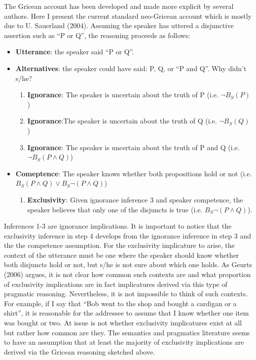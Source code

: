 \documentclass[oneside]{report}
\theoremstyle{definition}
\theoremstyle{definition}
\theoremstyle{definition}
\theoremstyle{remark}
\begin{document}
The Gricean account has been developed and made more explicit by several
authors. Here I present the current standard neo-Gricean account which
is mostly due to U. Sauerland (2004). Assuming the speaker has uttered a
disjunctive assertion such as ``P or Q'', the reasoning proceeds as
follows:
\begin{itemize}
\tightlist
\item
  \textbf{Utterance}: the speaker said ``P or Q''.
\item
  \textbf{Alternatives}: the speaker could have said: P, Q, or ``P and
  Q''. Why didn't s/he?
  \begin{enumerate}
  \def\labelenumi{\arabic{enumi}.}
  \tightlist
  \item
    \textbf{Ignorance}: The speaker is uncertain about the truth of P
    (i.e. \(\lnot B_S (P)\))
  \item
    \textbf{Ignorance}:The speaker is uncertain about the truth of Q
    (i.e. \(\lnot B_S (Q)\))
  \item
    \textbf{Ignorance}: The speaker is uncertain about the truth of P
    and Q (i.e. \(\lnot B_S (P \land Q)\))
  \end{enumerate}
\item
  \textbf{Comeptence}: The speaker knows whether both propositions hold
  or not (i.e. \(B_S (P \land Q) \lor B_S \lnot (P \land Q)\))
  \begin{enumerate}
  \def\labelenumi{\arabic{enumi}.}
  \setcounter{enumi}{3}
  \tightlist
  \item
    \textbf{Exclusivity}: Given ignorance inference 3 and speaker
    competence, the speaker believes that only one of the disjuncts is
    true (i.e. \(B_S \lnot (P \land Q)\)).
  \end{enumerate}
\end{itemize}
Inferences 1-3 are ignorance implications. It is important to notice
that the exclusivity inference in step 4 develops from the ignorance
inference in step 3 and the the competence assumption. For the
exclusivity implicature to arise, the context of the utterance must be
one where the speaker should know whether both disjuncts hold or not,
but s/he is not sure about which one holds. As Geurts (2006) argues, it
is not clear how common such contexts are and what proportion of
exclusivity implications are in fact implicatures derived via this type
of pragmatic reasoning. Nevertheless, it is not impossible to think of
such contexts. For example, if I say that ``Bob went to the shop and
bought a cardigan or a shirt'', it is reasonable for the addressee to
assume that I know whether one item was bought or two. At issue is not
whether exclusivity implicatures exist at all but rather how common are
they. The semantics and pragmatics literature seems to have an
assumption that at least the majority of exclusivity implications are
derived via the Gricean reasoning sketched above.
\end{document}
